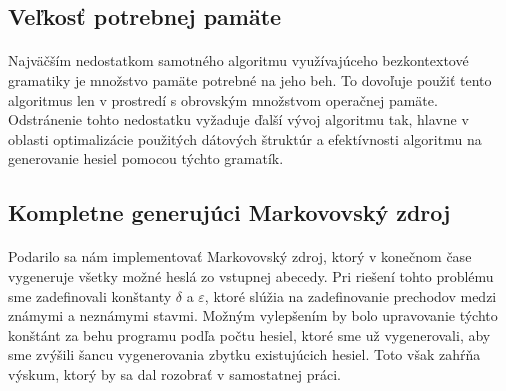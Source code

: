\subsection{Veľkosť potrebnej pamäte}
\paragraph{}
Najväčším nedostatkom samotného algoritmu využívajúceho bezkontextové gramatiky je množstvo pamäte potrebné na jeho beh. To dovoľuje použiť tento algoritmus len v prostredí s obrovským množstvom operačnej pamäte. Odstránenie tohto nedostatku vyžaduje ďalší vývoj algoritmu tak, hlavne v oblasti optimalizácie použitých dátových štruktúr a efektívnosti algoritmu na generovanie hesiel pomocou týchto gramatík.

\subsection{Kompletne generujúci Markovovský zdroj}
\paragraph{}
Podarilo sa nám implementovať Markovovský zdroj, ktorý v konečnom čase vygeneruje všetky možné heslá zo vstupnej abecedy. Pri riešení tohto problému sme zadefinovali konštanty \(\delta\) a \(\varepsilon\), ktoré slúžia na zadefinovanie prechodov medzi známymi a neznámymi stavmi. Možným vylepšením by bolo upravovanie týchto konštánt za behu programu podľa počtu hesiel, ktoré sme už vygenerovali, aby sme zvýšili šancu vygenerovania zbytku existujúcich hesiel. Toto však zahŕňa výskum, ktorý by sa dal rozobrať v samostatnej práci.
